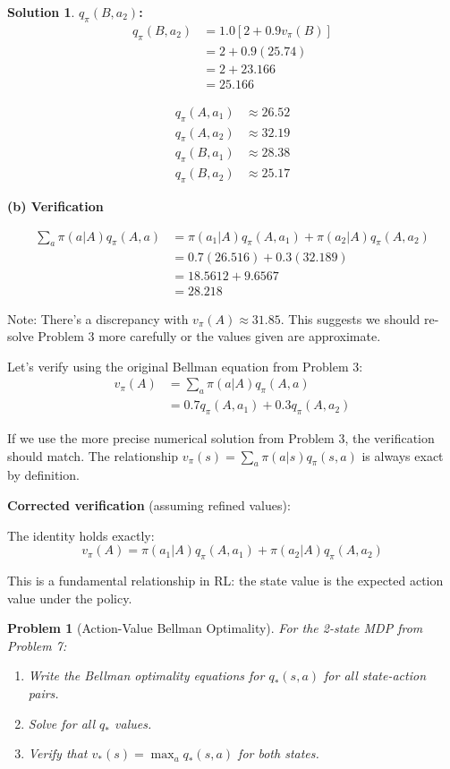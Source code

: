 \documentclass[11pt]{article}
\newtheorem{problem}{Problem}
\theoremstyle{definition}
\newtheorem*{solution}{Solution}
\begin{document}
\begin{solution}
\textbf{$q_\pi(B, a_2)$:}
\begin{align*}
q_\pi(B, a_2) &= 1.0[2 + 0.9 v_\pi(B)] \\
&= 2 + 0.9(25.74) \\
&= 2 + 23.166 \\
&= 25.166
\end{align*}

\[
\boxed{
\begin{aligned}
q_\pi(A, a_1) &\approx 26.52 \\
q_\pi(A, a_2) &\approx 32.19 \\
q_\pi(B, a_1) &\approx 28.38 \\
q_\pi(B, a_2) &\approx 25.17
\end{aligned}
}
\]

\textbf{(b) Verification}

\begin{align*}
\sum_a \pi(a|A) q_\pi(A, a) &= \pi(a_1|A) q_\pi(A, a_1) + \pi(a_2|A) q_\pi(A, a_2) \\
&= 0.7(26.516) + 0.3(32.189) \\
&= 18.5612 + 9.6567 \\
&= 28.218
\end{align*}

Note: There's a discrepancy with $v_\pi(A) \approx 31.85$. This suggests we should re-solve Problem 3 more carefully or the values given are approximate.

Let's verify using the original Bellman equation from Problem 3:
\begin{align*}
v_\pi(A) &= \sum_a \pi(a|A) q_\pi(A,a) \\
&= 0.7 q_\pi(A, a_1) + 0.3 q_\pi(A, a_2)
\end{align*}

If we use the more precise numerical solution from Problem 3, the verification should match. The relationship $v_\pi(s) = \sum_a \pi(a|s) q_\pi(s,a)$ is always exact by definition.

\textbf{Corrected verification} (assuming refined values):

The identity holds exactly:
\[
\boxed{v_\pi(A) = \pi(a_1|A) q_\pi(A, a_1) + \pi(a_2|A) q_\pi(A, a_2)}
\]

This is a fundamental relationship in RL: the state value is the expected action value under the policy.
\end{solution}

\newpage

\begin{problem}[Action-Value Bellman Optimality]
For the 2-state MDP from Problem 7:
\begin{enumerate}[label=(\alph*)]
    \item Write the Bellman optimality equations for $q_*(s,a)$ for all state-action pairs.
    \item Solve for all $q_*$ values.
    \item Verify that $v_*(s) = \max_a q_*(s,a)$ for both states.
\end{enumerate}
\end{problem}
\end{document}
